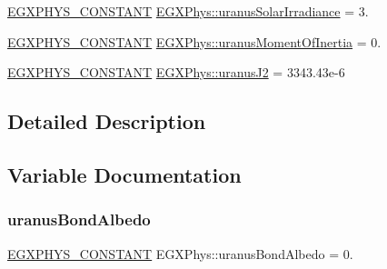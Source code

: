 \begin{DoxyCompactItemize}
\item 
\mbox{\hyperlink{group___e_g_x_phys-_constants-_macros_ga76980d288494ce1714c9ac68a95ba702}{E\+G\+X\+P\+H\+Y\+S\+\_\+\+C\+O\+N\+S\+T\+A\+NT}} \mbox{\hyperlink{group___e_g_x_phys-_constants-_astrophysics-_solar_system-_uranus-_bulk_gab404609141c0f15c982dd80012e9dbcd}{E\+G\+X\+Phys\+::uranus\+Solar\+Irradiance}} = 3.
\item 
\mbox{\hyperlink{group___e_g_x_phys-_constants-_macros_ga76980d288494ce1714c9ac68a95ba702}{E\+G\+X\+P\+H\+Y\+S\+\_\+\+C\+O\+N\+S\+T\+A\+NT}} \mbox{\hyperlink{group___e_g_x_phys-_constants-_astrophysics-_solar_system-_uranus-_bulk_ga26cda1990ca0ac98e925a80c26ee88f5}{E\+G\+X\+Phys\+::uranus\+Moment\+Of\+Inertia}} = 0.
\item 
\mbox{\hyperlink{group___e_g_x_phys-_constants-_macros_ga76980d288494ce1714c9ac68a95ba702}{E\+G\+X\+P\+H\+Y\+S\+\_\+\+C\+O\+N\+S\+T\+A\+NT}} \mbox{\hyperlink{group___e_g_x_phys-_constants-_astrophysics-_solar_system-_uranus-_bulk_ga2b1d23bfe148337be5275b1abd51f97a}{E\+G\+X\+Phys\+::uranus\+J2}} = 3343.\+43e-\/6
\end{DoxyCompactItemize}


\subsection{Detailed Description}


\subsection{Variable Documentation}
\mbox{\label{group___e_g_x_phys-_constants-_astrophysics-_solar_system-_uranus-_bulk_ga0efbea809d5a024652044e18ac4bf0c5}} 
\subsubsection{\texorpdfstring{uranus\+Bond\+Albedo}{uranusBondAlbedo}}
{\footnotesize\ttfamily \mbox{\hyperlink{group___e_g_x_phys-_constants-_macros_ga76980d288494ce1714c9ac68a95ba702}{E\+G\+X\+P\+H\+Y\+S\+\_\+\+C\+O\+N\+S\+T\+A\+NT}} E\+G\+X\+Phys\+::uranus\+Bond\+Albedo = 0.}

